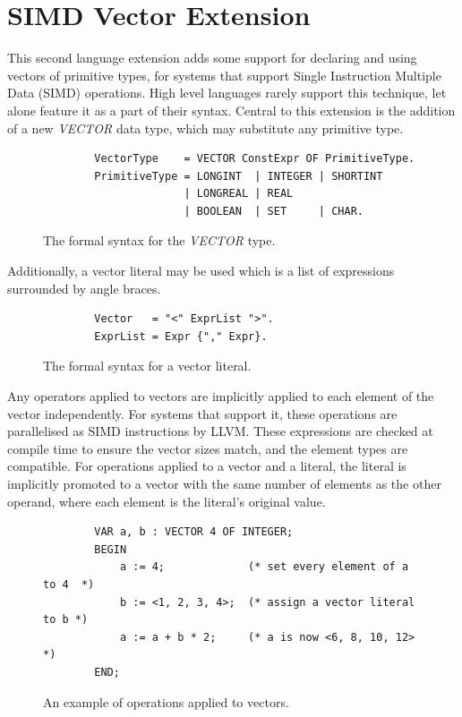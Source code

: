 \documentclass[a4paper,11pt]{article}
\begin{document}
    \section{SIMD Vector Extension}
    This second language extension adds some support for declaring and using vectors of primitive types, for systems that support Single Instruction Multiple Data (SIMD) operations. High level languages rarely support this technique, let alone feature it as a part of their syntax. Central to this extension is the addition of a new \emph{VECTOR} data type, which may substitute any primitive type.

    \begin{figure}[!htbp]
    \begin{lstlisting}
        VectorType    = VECTOR ConstExpr OF PrimitiveType.
        PrimitiveType = LONGINT  | INTEGER | SHORTINT
                      | LONGREAL | REAL 
                      | BOOLEAN  | SET     | CHAR.
    \end{lstlisting}
    \caption{The formal syntax for the \emph{VECTOR} type.}
    \end{figure}

    \noindent
    Additionally, a vector literal may be used which is a list of expressions surrounded by angle braces.
    
    \begin{figure}[!htbp]
    \begin{lstlisting}
        Vector   = "<" ExprList ">".
        ExprList = Expr {"," Expr}.
    \end{lstlisting}
    \caption{The formal syntax for a vector literal.}
    \end{figure}

    \noindent
    Any operators applied to vectors are implicitly applied to each element of the vector independently. For systems that support it, these operations are parallelised as SIMD instructions by LLVM. These expressions are checked at compile time to ensure the vector sizes match, and the element types are compatible. For operations applied to a vector and a literal, the literal is implicitly promoted to a vector with the same number of elements as the other operand, where each element is the literal's original value.

    \begin{figure}[!htbp]
    \begin{lstlisting}
        VAR a, b : VECTOR 4 OF INTEGER;
        BEGIN
            a := 4;             (* set every element of a to 4  *)
            b := <1, 2, 3, 4>;  (* assign a vector literal to b *)
            a := a + b * 2;     (* a is now <6, 8, 10, 12>      *)
        END;
    \end{lstlisting}
    \caption{An example of operations applied to vectors.}
    \end{figure}
\end{document}
